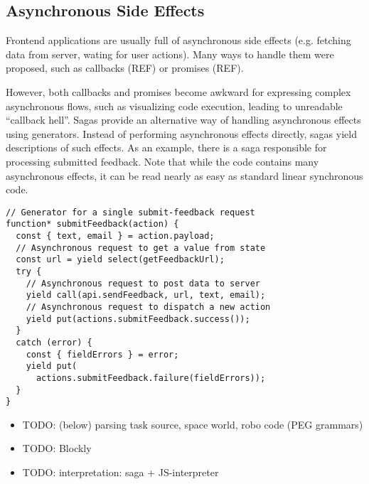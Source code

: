 \subsection{Asynchronous Side Effects}

Frontend applications are usually full of asynchronous side effects
(e.g. fetching data from server, wating for user actions).
Many ways to handle them were proposed,
such as callbacks (REF) or promises (REF).

However, both callbacks and promises become awkward for expressing complex
asynchronous flows, such as visualizing code execution,
leading to unreadable ``callback hell''. %
Sagas provide an alternative way of handling asynchronous effects using generators.
Instead of performing asynchronous effects directly, sagas yield
descriptions of such effects.
As an example, there is a saga responsible for processing
submitted feedback.
Note that while the code contains many asynchronous effects,
it can be read nearly as easy as standard linear synchronous code.


\begin{lstlisting}[language=ES6]
// Generator for a single submit-feedback request
function* submitFeedback(action) {
  const { text, email } = action.payload;
  // Asynchronous request to get a value from state
  const url = yield select(getFeedbackUrl);
  try {
    // Asynchronous request to post data to server
    yield call(api.sendFeedback, url, text, email);
    // Asynchronous request to dispatch a new action
    yield put(actions.submitFeedback.success());
  }
  catch (error) {
    const { fieldErrors } = error;
    yield put(
      actions.submitFeedback.failure(fieldErrors));
  }
}
\end{lstlisting}



\begin{itemize}
\item TODO: (below) parsing task source, space world, robo code (PEG grammars)
\item TODO: Blockly
\item TODO: interpretation: saga + JS-interpreter
\end{itemize}

